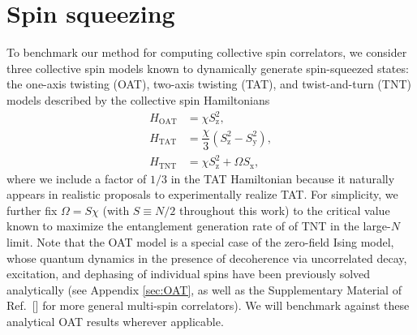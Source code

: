\documentclass[pra,reprint,longbibliography]{revtex4-1}
\renewcommand{\t}{\text} %
\newcommand{\f}[2]{\dfrac{#1}{#2}} %
\newcommand{\p}[1]{\left(#1\right)} %
\newcommand{\z}{\text{z}}
\newcommand{\x}{\text{x}}
\newcommand{\y}{\text{y}}
\newcommand{\1}{\mathds{1}}
\begin{document}
\section{Spin squeezing}

To benchmark our method for computing collective spin correlators, we
consider three collective spin models known to dynamically generate
spin-squeezed states: the one-axis twisting (OAT), two-axis twisting
(TAT), and twist-and-turn (TNT) models described by the collective
spin Hamiltonians\cite{kitagawa1993squeezed, micheli2003manyparticle}
\begin{align}
  \label{eq:OAT}
  H_{\t{OAT}} &= \chi S_\z^2, \\
  \label{eq:TAT}
  H_{\t{TAT}} &= \f{\chi}{3} \p{S_\z^2 - S_\y^2}, \\
  \label{eq:TNT}
  H_{\t{TNT}} &= \chi S_\z^2 + \Omega S_\x,
\end{align}
where we include a factor of $1/3$ in the TAT Hamiltonian because it
naturally appears in realistic proposals to experimentally realize
TAT\cite{liu2011spin, huang2015twoaxis}.  For simplicity, we further
fix $\Omega=S\chi$ (with $S\equiv N/2$ throughout this work) to the
critical value known to maximize the entanglement generation rate of
of TNT in the large-$N$ limit\cite{micheli2003manyparticle,
  sorelli2015fast}.  Note that the OAT model is a special case of the
zero-field Ising model, whose quantum dynamics in the presence of
decoherence via uncorrelated decay, excitation, and dephasing of
individual spins have been previously solved
analytically\cite{foss-feig2013nonequilibrium} (see Appendix
\ref{sec:OAT}, as well as the Supplementary Material of
Ref.~[] for more general multi-spin
correlators).  We will benchmark against these analytical OAT results
wherever applicable.
\end{document}
